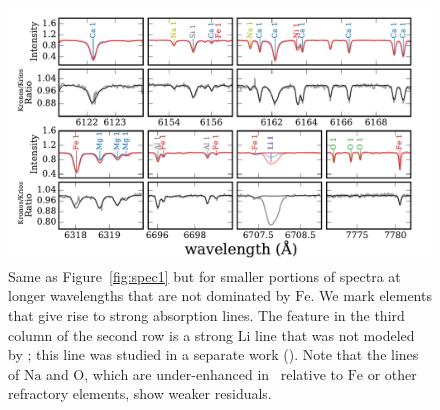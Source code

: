 \documentclass[modern, letterpaper]{aastex61}
\newcommand{\figname}{Figure}
\newcommand*\elem[1]{\ensuremath{\mathrm{#1}}}
\newcommand{\bizarreone}{\text{Kronos}}
\begin{document}
\begin{figure}[htpb]
  \centering
  \includegraphics[width=0.95\linewidth]{spec2.pdf}
  \caption{Same as \figname~\ref{fig:spec1}
    but for smaller portions of spectra at longer wavelengths that are
    not dominated by \elem{Fe}.
    We mark elements that give rise to strong absorption lines.
    The feature in the third column of the second row is a strong \elem{Li}
    line that was not modeled by \citealt{2016ApJS..225...32B}; this line was
    studied in a separate work (\citealt{jmlithium}).
    Note that the lines of \elem{Na} and \elem{O}, which are under-enhanced
    in \bizarreone\ relative to \elem{Fe} or other refractory elements,
    show weaker residuals.
  }
  \label{fig:spec2}
\end{figure}
\end{document}
